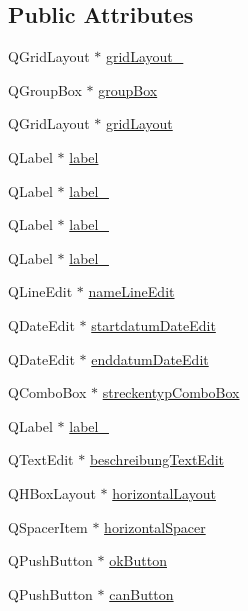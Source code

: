 \subsection*{Public Attributes}
\begin{CompactItemize}
\item 
QGridLayout $\ast$ \hyperlink{class_ui___neues_rennen_dialog_class_b7bbe9bfce4cdf51576069669bdfe61e}{gridLayout\_}
\item 
QGroupBox $\ast$ \hyperlink{class_ui___neues_rennen_dialog_class_b8ed1f394f8fc03f26c2419dd79c6201}{groupBox}
\item 
QGridLayout $\ast$ \hyperlink{class_ui___neues_rennen_dialog_class_6b613d405d3f82eeec61e6ded0729642}{gridLayout}
\item 
QLabel $\ast$ \hyperlink{class_ui___neues_rennen_dialog_class_4d27822f812528d8321a91abe9c25250}{label}
\item 
QLabel $\ast$ \hyperlink{class_ui___neues_rennen_dialog_class_f0a87dcf37a3df895a558c395862fc4a}{label\_}
\item 
QLabel $\ast$ \hyperlink{class_ui___neues_rennen_dialog_class_6307719ca998b622dee621144d1f4a8a}{label\_}
\item 
QLabel $\ast$ \hyperlink{class_ui___neues_rennen_dialog_class_173af6d532e17f3a4c167aa1f84a890e}{label\_}
\item 
QLineEdit $\ast$ \hyperlink{class_ui___neues_rennen_dialog_class_9f58eb9025657715d9e2de3ee250be22}{nameLineEdit}
\item 
QDateEdit $\ast$ \hyperlink{class_ui___neues_rennen_dialog_class_60dd7a101071bae85e8e5ba2c58d3428}{startdatumDateEdit}
\item 
QDateEdit $\ast$ \hyperlink{class_ui___neues_rennen_dialog_class_e6e91b167041fc6cb41b36c94ffffada}{enddatumDateEdit}
\item 
QComboBox $\ast$ \hyperlink{class_ui___neues_rennen_dialog_class_b904c89e6e1673d355f838a138d5ff77}{streckentypComboBox}
\item 
QLabel $\ast$ \hyperlink{class_ui___neues_rennen_dialog_class_2fe7543720c49cd2301d5eede3a99a46}{label\_}
\item 
QTextEdit $\ast$ \hyperlink{class_ui___neues_rennen_dialog_class_0d8e036f38577007c155d374a80a9f41}{beschreibungTextEdit}
\item 
QHBoxLayout $\ast$ \hyperlink{class_ui___neues_rennen_dialog_class_e1a207b3a37d62a05583b95c56603190}{horizontalLayout}
\item 
QSpacerItem $\ast$ \hyperlink{class_ui___neues_rennen_dialog_class_bd1fd6e28cf47bf5ad89aa84ef560075}{horizontalSpacer}
\item 
QPushButton $\ast$ \hyperlink{class_ui___neues_rennen_dialog_class_914caf299025ede811950554f59fffcd}{okButton}
\item 
QPushButton $\ast$ \hyperlink{class_ui___neues_rennen_dialog_class_ac096d5a91439616d9091ef583e4d4be}{canButton}
\end{CompactItemize}


